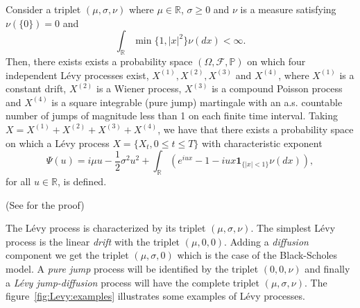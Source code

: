 \begin{thm}
Consider a triplet $(\mu,\sigma,\nu)$ where $\mu\in\mathbb{R}$, $\sigma\geq 0$ and $\nu$ is a measure satisfying $\nu(\{0\}) = 0$ and
$$\int_\mathbb{R} \min\{1,|x|^2\}\nu(dx)<\infty.$$
Then, there exists exists a probability space $(\Omega,\mathcal{F},\mathbb{P})$ on which four independent L\'evy processes exist, $X^{(1)},X^{(2)},X^{(3)}$ and $X^{(4)}$, where $X^{(1)}$ is a constant drift, $X^{(2)}$ is a Wiener process, $X^{(3)}$ is a compound Poisson process and $X^{(4)}$ is a square integrable (pure jump) martingale with an a.s. countable number of jumps of magnitude less than 1 on each finite time interval. Taking $X = X^{(1)}+X^{(2)}+X^{(3)}+X^{(4)}$, we have that there exists a probability space on which a L\'evy process $X = \{X_t,0\leq t \leq T\}$ with characteristic exponent
$$\Psi(u) = i\mu u -\frac{1}{2}\sigma^2u^2+\int_\mathbb{R}\left(e^{iux}-1-iux\mathbf{1}_{\{|x|<1\}}\nu(dx)\right),$$
for all $u\in\mathbb{R}$, is defined.

(See \citeauthor{Kyp06} \citeyearpar{Kyp06} for the proof)
\end{thm}

The L\'evy process is characterized by its triplet $(\mu,\sigma,\nu)$. The simplest L\'evy process is the linear \textit{drift} with the triplet $(\mu,0,0)$. Adding a \textit{diffusion} component we get the triplet $(\mu,\sigma,0)$ which is the case of the Black-Scholes model. A \textit{pure jump} process will be identified by the triplet $(0,0,\nu)$ and finally a \textit{L\'evy jump-diffusion} process will have the complete triplet $(\mu,\sigma,\nu)$. The figure~\ref{fig:Levy:examples} illustrates some examples of L\'evy processes.

